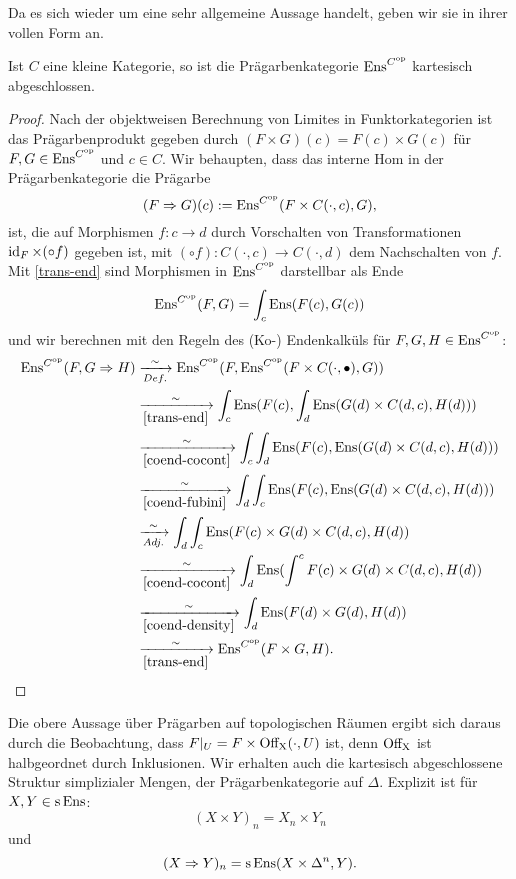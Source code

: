 Da es sich wieder um eine sehr allgemeine Aussage handelt, geben wir
sie in ihrer vollen Form an.
\begin{prop}
  Ist $C$ eine kleine Kategorie, so ist die Prägarbenkategorie
  $\operatorname{Ens}^{C^\mathrm{op}}$ kartesisch abgeschlossen.
\end{prop}
\begin{proof}
  Nach der objektweisen Berechnung von Limites in Funktorkategorien
  ist das Prägarbenprodukt gegeben durch $(F \times G)(c) = F(c)
  \times G(c)$ für $F, G \in \operatorname{Ens}^{C^\mathrm{op}}$ und $c \in C$. Wir
  behaupten, dass das interne Hom in der Prägarbenkategorie die
  Prägarbe
  \[ (F \Rightarrow G)(c) := \operatorname{Ens}^{C^\mathrm{op}}(F \times C(\cdot, c), G), \]
  ist, die auf Morphismen $f: c \to d$ durch Vorschalten von
  Transformationen $\operatorname{id}_F \times (\circ f)$ gegeben ist, mit $(\circ
  f): C(\cdot, c) \to C(\cdot, d)$ dem Nachschalten von $f$. Mit
  \ref{trans-end} sind Morphismen in $\operatorname{Ens}^{C^\mathrm{op}}$ darstellbar als
  Ende
  \[ \operatorname{Ens}^{C^\mathrm{op}}(F, G) = \int_c \operatorname{Ens}(F(c), G(c)) \]
  und wir berechnen mit den Regeln des (Ko-) Endenkalküls für $F, G, H
  \in \operatorname{Ens}^{C^\mathrm{op}}$:
  \begin{align*}
    \operatorname{Ens}^{C^\mathrm{op}}(F, G \Rightarrow H)
    &\xrightarrow[Def.]{\sim} \operatorname{Ens}^{C^\mathrm{op}}(F, \operatorname{Ens}^{C^\mathrm{op}}(F \times C(\cdot, \bullet), G)) \\
    &\xrightarrow[\ref{trans-end}]{\sim}
     \int_c \operatorname{Ens}(F(c), \int_d \operatorname{Ens}(G(d) \times C(d, c), H(d))) \\
    &\xrightarrow[\ref{coend-cocont}]{\sim}
     \int_c \int_d \operatorname{Ens}(F(c), \operatorname{Ens}(G(d) \times C(d, c), H(d))) \\
    &\xrightarrow[\ref{coend-fubini}]{\sim}
     \int_d \int_c \operatorname{Ens}(F(c), \operatorname{Ens}(G(d) \times  C(d, c), H(d))) \\
    &\xrightarrow[Adj.]{\sim} \int_d \int_c \operatorname{Ens}(F(c) \times G(d) \times C(d, c), H(d)) \\
    &\xrightarrow[\ref{coend-cocont}]{\sim}
     \int_d \operatorname{Ens}( \int^c F(c) \times G(d) \times C(d, c), H(d)) \\
    &\xrightarrow[\ref{coend-density}]{\sim}
     \int_d \operatorname{Ens}( F(d) \times G(d), H(d)) \\
    &\xrightarrow[\ref{trans-end}]{\sim}
     \operatorname{Ens}^{C^\mathrm{op}}(F \times G, H).
  \end{align*}
\end{proof}
Die obere Aussage über Prägarben auf topologischen Räumen ergibt sich
daraus durch die Beobachtung, dass $F|_U = F \times \operatorname{Off_X}(\cdot, U)$
ist, denn $\operatorname{Off_X}$ ist halbgeordnet durch Inklusionen. Wir erhalten
auch die kartesisch abgeschlossene Struktur simplizialer Mengen, der
Prägarbenkategorie auf $\Delta$. Explizit ist für $X, Y \in \operatorname{s}\operatorname{Ens}$:
\[ (X \times Y)_n = X_n \times Y_n \]
und
\[ (X \Rightarrow Y)_n = \operatorname{s}\operatorname{Ens}(X \times \Delta^n, Y). \]

